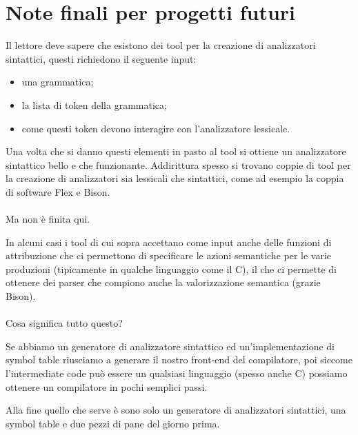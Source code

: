\documentclass[class=book, crop=false, oneside, 12pt]{standalone}
\begin{document}
\section{Note finali per progetti futuri}
Il lettore deve sapere che esistono dei tool per la creazione di analizzatori sintattici, questi richiedono il seguente input:
\begin{itemize}
    \item una grammatica;
    \item la lista di token della grammatica; 
    \item come questi token devono interagire con l'analizzatore lessicale.
\end{itemize}
Una volta che si danno questi elementi in pasto al tool si ottiene un analizzatore sintattico bello e che funzionante. Addirittura spesso si trovano coppie di tool per la creazione di analizzatori sia lessicali che sintattici, come ad esempio la coppia di software Flex e Bison.
\\\\
Ma non è finita qui.

In alcuni casi i tool di cui sopra accettano come input anche delle funzioni di attribuzione che ci permettono di specificare le azioni semantiche per le varie produzioni (tipicamente in qualche linguaggio come il C), il che ci permette di ottenere dei parser che compiono anche la valorizzazione semantica (grazie Bison).
\\\\
Cosa significa tutto questo?

Se abbiamo un generatore di analizzatore sintattico ed un'implementazione di symbol table riusciamo a generare il nostro front-end del compilatore, poi siccome l'intermediate code può essere un qualsiasi linguaggio (spesso anche C) possiamo ottenere un compilatore in pochi semplici passi.

Alla fine quello che serve è sono solo un generatore di analizzatori sintattici, una symbol table e due pezzi di pane del giorno prima.
\end{document}
